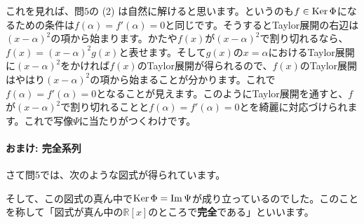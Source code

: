 これを見れば、問$5$の (2) は自然に解けると思います。というのも$f\in \operatorname{Ker} \Phi$になるための条件は$f(\alpha) = f'(\alpha) = 0$と同じです。そうするとTaylor展開の右辺は$(x - \alpha)^2$の項から始まります。かたや$f(x)$が$(x - \alpha)^2$で割り切れるなら、$f(x) = (x - \alpha)^2 g(x)$と表せます。そして$g(x)$の$x = \alpha$におけるTaylor展開に$(x - \alpha)^2$をかければ$f(x)$のTaylor展開が得られるので、$f(x)$のTaylor展開はやはり$(x - \alpha)^2$の項から始まることが分かります。これで$f(\alpha) = f'(\alpha) = 0$となることが見えます。このようにTaylor展開を通すと、$f$が$(x - \alpha)^2$で割り切れることと$f(\alpha) = f'(\alpha) = 0$とを綺麗に対応づけられます。これで写像$\Psi$に当たりがつくわけです。

\paragraph{おまけ: 完全系列} さて問5では、次のような図式が得られています。
\begin{center}
\end{center}
そして、この図式の真ん中で$\operatorname{Ker} \Phi = \mathrm{Im}\, \Psi$が成り立っているのでした。このことを称して「図式が真ん中の$\mathbb{R}[x]$のところで\textbf{完全}である」といいます。

\begin{center}
\end{center}

